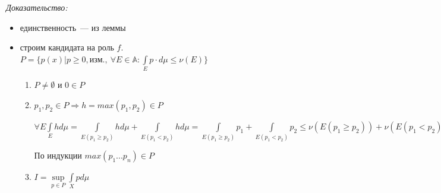 \documentclass[paper=a4, fontsize=17pt]{article}
\begin{document}
	\emph{Доказательство:}
		\begin{itemize}
			\item единственность~--- из леммы
			\item строим кандидата на роль $f$. $P = \{p(x) | p \geq 0, \text{изм.},\ \forall E \in \mathbb{A} : \int\limits_E p \cdot d\mu \leq \nu(E)\}$
			\begin{enumerate}
				\item
				$P \neq \emptyset$ и $0 \in P$
				\item
				$p_1, p_2 \in P \Rightarrow h = max(p_1, p_2) \in P$

				$\forall E \int\limits_E h d\mu = \int\limits_{E(p_1 \geq p_2)} h d\mu + \int\limits_{E(p_1 < p_2)} h d\mu =
				\int\limits_{E(p_1 \geq p_2)} p_1 + \int\limits_{E(p_1 < p_2)} p_2 \leq \nu(E(p_1 \geq p_2)) + \nu(E(p_1 < p_2)) = \nu E$

				По индукции $max(p_1...p_n)\in P$
				\item
				$I = \sup\limits_{p \in P} \int\limits_X p d\mu$


\end{enumerate}
\end{itemize}
\end{document}
